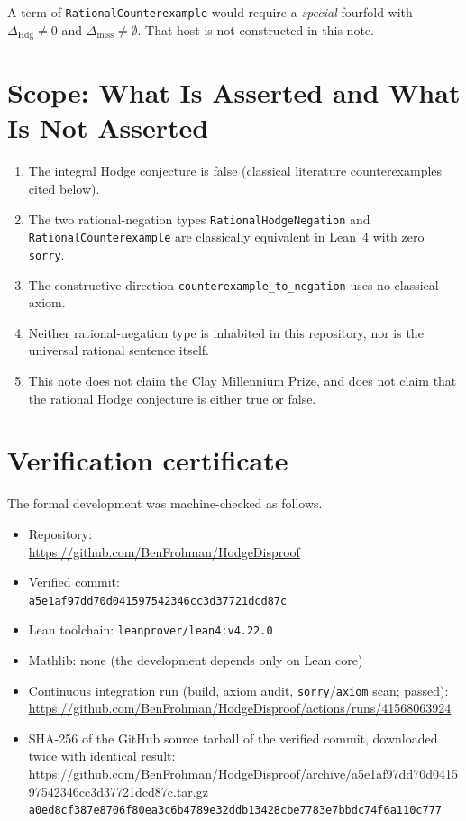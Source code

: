 \documentclass[11pt]{amsart}
\begin{document}
A term of \texttt{RationalCounterexample} would require a \emph{special} fourfold with $\Delta_{\mathrm{Hdg}}\neq 0$ and $\Delta_{\mathrm{miss}}\neq\emptyset$. That host is not constructed in this note.

\section{Scope: What Is Asserted and What Is Not Asserted}

\begin{enumerate}
  \item The integral Hodge conjecture is false (classical literature counterexamples cited below).
  \item The two rational-negation types \texttt{RationalHodgeNegation} and \texttt{RationalCounterexample} are classically equivalent in Lean~4 with zero \texttt{sorry}.
  \item The constructive direction \texttt{counterexample\_to\_negation} uses no classical axiom.
  \item Neither rational-negation type is inhabited in this repository, nor is the universal rational sentence itself.
  \item This note does not claim the Clay Millennium Prize, and does not claim that the rational Hodge conjecture is either true or false.
\end{enumerate}

\appendix
\section{Verification certificate}\label{app:verification-certificate}

The formal development was machine-checked as follows.

{\raggedright
\begin{itemize}
\item Repository:\\ {\footnotesize\url{https://github.com/BenFrohman/HodgeDisproof}}
\item Verified commit:\\ {\footnotesize\texttt{a5e1af97dd70d041597542346cc3d37721dcd87c}}
\item Lean toolchain: \texttt{leanprover/lean4:v4.22.0}
\item Mathlib: none (the development depends only on Lean core)
\item Continuous integration run (build, axiom audit, \texttt{sorry}/\texttt{axiom} scan; passed):\\ {\footnotesize\url{https://github.com/BenFrohman/HodgeDisproof/actions/runs/41568063924}}
\item SHA-256 of the GitHub source tarball of the verified commit, downloaded twice with identical result:\\ {\footnotesize\url{https://github.com/BenFrohman/HodgeDisproof/archive/a5e1af97dd70d041597542346cc3d37721dcd87c.tar.gz}}\\
{\footnotesize\texttt{a0ed8cf387e8706f80ea3c6b4789e32ddb13428cbe7783e7bbdc74f6a110c777}}
\end{itemize}\par}
\end{document}
